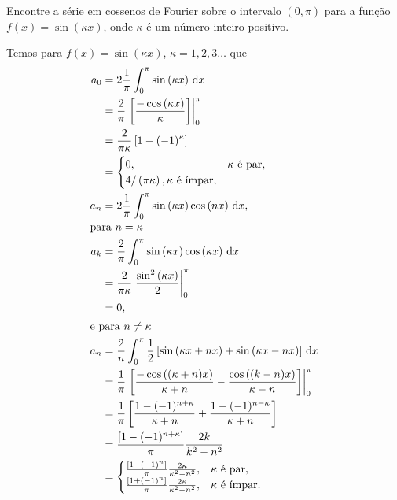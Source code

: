 \documentclass[a4paper,12pt, leqno, answers]{exam}
\begin{document}
\begin{questions}
    \question[T1 de 2011] Encontre a s\'{e}rie em cossenos de Fourier sobre o intervalo $(0, \pi)$ para a fun\c{c}\~{a}o $f(x) = \sin\left( \kappa x \right)$, onde $\kappa$ \'{e} um n\'{u}mero inteiro positivo.
    \begin{solution}
        Temos para $f(x) = \sin\left( \kappa x \right)$, $\kappa = 1, 2, 3 \ldots$ que
        \begin{align*}
            a_0 &= 2 \frac{1}{\pi} \int_0^\pi \sin\left( \kappa x \right) \, \mathrm{d}x \\
            &= \frac{2}{\pi} \left. \left[ \frac{-\cos\left( \kappa x \right)}{\kappa} \right] \right|_0^\pi \\
            &= \frac{2}{\pi \kappa} \left[ 1 - (-1)^\kappa \right] \\
            &= \begin{cases}
                0, & \kappa \text{ \'{e} par}, \\
                4 / \left( \pi \kappa \right), \kappa \text{ \'{e} \'{i}mpar},
            \end{cases} \\
            a_n &= 2 \frac{1}{\pi} \int_0^\pi \sin\left( \kappa x \right) \cos\left( n x \right) \, \mathrm{d}x, \\
            \intertext{para $n = \kappa$}
            a_k &= \frac{2}{\pi} \int_0^\pi \sin\left( \kappa x \right) \cos\left( \kappa x \right) \, \mathrm{d}x \\
            &= \frac{2}{\pi \kappa} \left. \frac{\sin^2\left( \kappa x \right)}{2} \right|_0^\pi \\
            &= 0, \\
            \intertext{e para $n \neq \kappa$}
            a_n &= \frac{2}{n} \int_0^\pi \frac{1}{2} \left[ \sin\left( \kappa x + n x \right) + \sin\left( \kappa x - n x \right) \right] \, \mathrm{d}x \\
            &= \frac{1}{\pi} \left. \left[ \frac{- \cos\left( (\kappa + n) x \right)}{\kappa + n} - \frac{\cos\left( (k - n) x \right)}{\kappa - n} \right] \right|_0^\pi \\
            &= \frac{1}{\pi} \left[ \frac{1 - (-1)^{n + \kappa}}{\kappa + n} + \frac{1 - (-1)^{n - \kappa}}{\kappa + n} \right] \\
            &= \frac{\left[ 1 - (-1)^{n + \kappa} \right]}{\pi} \frac{2 k}{k^2 - n^2} \\
            &= \begin{cases}
                \frac{\left[ 1 - (-1)^n \right]}{\pi} \frac{2 \kappa}{\kappa^2 - n^2}, & \kappa \text{ \'{e} par}, \\
                \frac{\left[ 1 + (-1)^n \right]}{\pi} \frac{2 \kappa}{\kappa^2 - n^2}, & \kappa \text{ \'{e} \'{i}mpar}.
            \end{cases}
        \end{align*}


\end{solution}
\end{questions}
\end{document}
